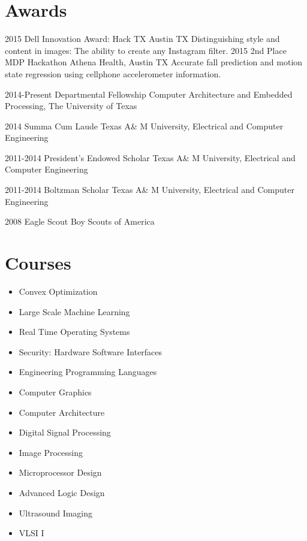 \documentclass[]{friggeri-cv} %
\begin{document}

\section{Awards}

\begin{entrylist}

\entry
{2015}
{Dell Innovation Award: Hack TX} 
{Austin TX}
{Distinguishing style and content in images: The ability to create any Instagram filter.}
\entry
{2015}
{2nd Place MDP Hackathon} 
{Athena Health, Austin TX}
{Accurate fall prediction and motion state regression using cellphone accelerometer information.}

\entry
{2014-Present}
{Departmental Fellowship}
{Computer Architecture and Embedded Processing, The University of Texas}
{}

\entry
{2014}
{Summa Cum Laude}
{Texas A\& M University,  Electrical and Computer Engineering}
{}

\entry
{2011-2014}
{President's Endowed Scholar}
{Texas A\& M University,  Electrical and Computer Engineering}
{}

\entry
{2011-2014}
{Boltzman Scholar}
{Texas A\& M University,  Electrical and Computer Engineering}
{}

\entry
{2008}
{Eagle Scout}
{Boy Scouts of America}
{}

\end{entrylist}

\section{Courses}
\begin{itemize}
\item Convex Optimization
\item Large Scale Machine Learning
\item Real Time Operating Systems
\item Security: Hardware Software Interfaces
\item Engineering Programming Languages
\item Computer Graphics
\item Computer Architecture
\item Digital Signal Processing
\item Image Processing
\item Microprocessor Design
\item Advanced Logic Design
\item Ultrasound Imaging
\item VLSI I
\end{itemize}
\end{document}
